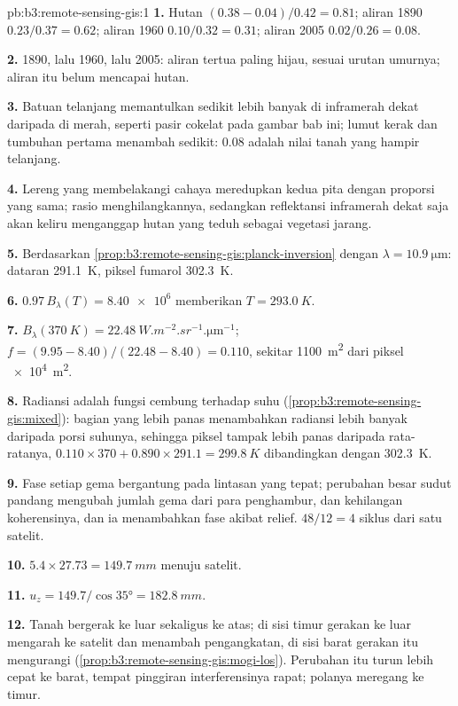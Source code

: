\begin{solution}{pb:b3:remote-sensing-gis:1}
\textbf{1.} Hutan $(0.38 - 0.04)/0.42 = 0.81$; aliran 1890 $0.23/0.37 =
0.62$; aliran 1960 $0.10/0.32 = 0.31$; aliran 2005 $0.02/0.26 = 0.08$.

\textbf{2.} 1890, lalu 1960, lalu 2005: aliran tertua paling hijau,
sesuai urutan umurnya; aliran itu belum mencapai hutan.

\textbf{3.} Batuan telanjang memantulkan sedikit lebih banyak di inframerah dekat daripada di
merah, seperti pasir cokelat pada gambar bab ini; lumut kerak dan tumbuhan pertama
menambah sedikit: 0.08 adalah nilai tanah yang hampir telanjang.

\textbf{4.} Lereng yang membelakangi cahaya meredupkan kedua pita dengan proporsi yang sama;
rasio menghilangkannya, sedangkan reflektansi inframerah dekat saja
akan keliru menganggap hutan yang teduh sebagai vegetasi jarang.

\textbf{5.} Berdasarkan \cref{prop:b3:remote-sensing-gis:planck-inversion} dengan
$\lambda = \qty{10.9}{\micro\metre}$: dataran \qty{291.1}{K},
piksel fumarol \qty{302.3}{K}.

\textbf{6.} $0.97\,B_\lambda(T) = \num{8.40e6}$ memberikan $T = \qty{293.0}{K}$.

\textbf{7.} $B_\lambda(\qty{370}{K}) =
\qty{22.48}{W.m^{-2}.sr^{-1}.\micro\metre^{-1}}$; $f = (9.95 - 8.40)/(22.48
- 8.40) = 0.110$, sekitar \qty{1100}{m^2} dari piksel \qty{e4}{m^2}.

\textbf{8.} Radiansi adalah fungsi cembung terhadap suhu
(\cref{prop:b3:remote-sensing-gis:mixed}): bagian yang lebih panas menambahkan radiansi lebih banyak
daripada porsi suhunya, sehingga piksel tampak lebih panas daripada rata-ratanya,
$0.110\times370 + 0.890\times291.1 = \qty{299.8}{K}$ dibandingkan dengan
\qty{302.3}{K}.

\textbf{9.} Fase setiap gema bergantung pada lintasan yang tepat; perubahan besar
sudut pandang mengubah jumlah gema dari para penghambur, dan
 kehilangan koherensinya, dan ia menambahkan fase akibat relief.
$48/12 = 4$ siklus dari satu satelit.

\textbf{10.} $5.4\times27.73 = \qty{149.7}{mm}$ menuju satelit.

\textbf{11.} $u_z = 149.7/\cos\ang{35} = \qty{182.8}{mm}$.

\textbf{12.} Tanah bergerak ke luar sekaligus ke atas; di sisi timur
gerakan ke luar mengarah ke satelit dan menambah pengangkatan, di sisi barat
gerakan itu mengurangi (\cref{prop:b3:remote-sensing-gis:mogi-los}). Perubahan itu
turun lebih cepat ke barat, tempat pinggiran interferensinya rapat; polanya
meregang ke timur.


\end{solution}
